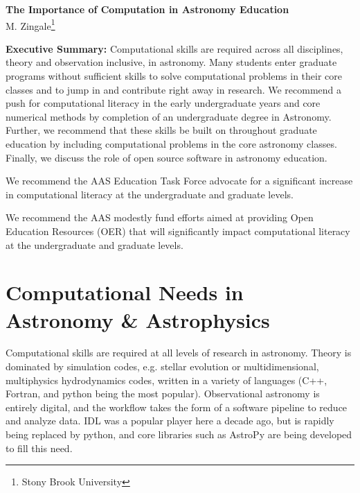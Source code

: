 \documentclass[11pt]{article}
\begin{document}
\thispagestyle{plain}

\begin{center}
{\Large \sffamily \bfseries The Importance of Computation in Astronomy Education} \\
{M. Zingale\footnote{Stony Brook University}}
\end{center}

\begin{tcolorbox}
{\sffamily \bfseries Executive Summary:} Computational skills are required
across all disciplines, theory and observation inclusive, in astronomy.
Many students enter graduate programs without sufficient skills
to solve computational problems in their core classes and to jump in and
contribute right away in research.  We recommend a push for computational
literacy in the early undergraduate years and core numerical methods by
completion of an undergraduate degree in Astronomy.  Further, we recommend
that these skills be built on throughout graduate education by including
computational problems in the core astronomy classes.  Finally, we discuss
the role of open source software in astronomy education.

\vspace {0.1in}
We recommend the AAS Education Task Force advocate for a significant
increase in computational literacy at the undergraduate and graduate levels.

\vspace {0.1in}
We recommend the AAS modestly fund efforts aimed at providing Open Education Resources (OER)
that will significantly impact computational literacy at the undergraduate and graduate levels.


\end{tcolorbox}

\section{Computational Needs in Astronomy \& Astrophysics}

Computational skills are required at all levels of research in
astronomy.  Theory is dominated by simulation codes, e.g. stellar
evolution or multidimensional, multiphysics hydrodynamics codes,
written in a variety of languages (C++, Fortran, and python being the
most popular).  Observational astronomy is entirely digital, and the
workflow takes the form of a software pipeline to reduce and analyze
data.  IDL was a popular player here a decade ago, but is rapidly
being replaced by python, and core libraries such as AstroPy are being
developed to fill this need.
\end{document}

